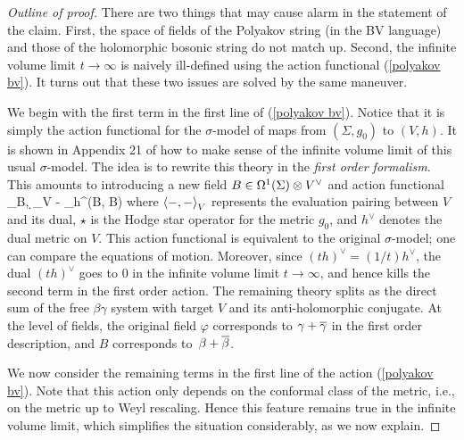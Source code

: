 \begin{proof}[Outline of proof] 
There are two things that may cause alarm in the statement of the claim. 
First, the space of fields of the Polyakov string (in the BV language) and those of the holomorphic bosonic string do not match up. 
Second, the infinite volume limit $t \to \infty$ is naively ill-defined using the action functional (\ref{polyakov bv}). 
It turns out that these two issues are solved by the same maneuver. 

We begin with the first term in the first line of (\ref{polyakov bv}). 
Notice that it is simply the action functional for the $\sigma$-model of maps from $(\Sigma, g_0)$ to $(V, h)$. 
It is shown in Appendix 21 of \cite{GGW} how to make sense of the infinite volume limit of this usual $\sigma$-model. 
The idea is to rewrite this theory in the {\em first order formalism}.
This amounts to introducing a new field $B \in \Omega^1(\Sigma) \tensor V^\vee$ and action functional 
\ben
\int_\Sigma \<B, \d \varphi\>_V -  \int_\Sigma h^\vee(B, \star B)
\een
where $\<-,-\>_V$ represents the evaluation pairing between $V$ and its dual, 
$\star$ is the Hodge star operator for the metric $g_0$, 
and $h^\vee$ denotes the dual metric on $V$. 
This action functional is equivalent to the original $\sigma$-model;
one can compare the equations of motion. 
Moreover, since $(th)^\vee = (1/t)h^\vee$, 
the dual $(th)^\vee$ goes to $0$ in the infinite volume limit $t \to \infty$, 
and hence kills the second term in the first order action. 
The remaining theory splits as the direct sum of the free $\beta\gamma$ system with target $V$ and its anti-holomorphic conjugate. 
At the level of fields, the original field $\varphi$ corresponds to $\gamma + \Bar{\gamma}$ in the first order description,
and $B$ corresponds to~$\beta+\Bar{\beta}$. 

We now consider the remaining terms in the first line of the action (\ref{polyakov bv}). 
Note that this action only depends on the conformal class of the metric, 
i.e., on the metric up to Weyl rescaling.
Hence this feature remains true in the infinite volume limit,
which simplifies the situation considerably, as we now explain.


\end{proof}
